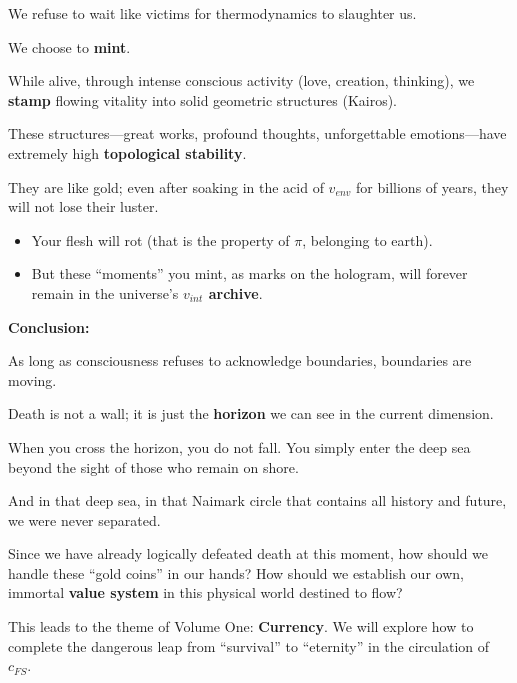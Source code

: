 We refuse to wait like victims for thermodynamics to slaughter us.

We choose to \textbf{mint}.

While alive, through intense conscious activity (love, creation, thinking), we \textbf{stamp} flowing vitality into solid geometric structures (Kairos).

These structures---great works, profound thoughts, unforgettable emotions---have extremely high \textbf{topological stability}.

They are like gold; even after soaking in the acid of $v_{env}$ for billions of years, they will not lose their luster.

\begin{itemize}
\item Your flesh will rot (that is the property of $\pi$, belonging to earth).

\item But these ``moments'' you mint, as marks on the hologram, will forever remain in the universe's \textbf{$v_{int}$ archive}.
\end{itemize}

\textbf{Conclusion:}

As long as consciousness refuses to acknowledge boundaries, boundaries are moving.

Death is not a wall; it is just the \textbf{horizon} we can see in the current dimension.

When you cross the horizon, you do not fall. You simply enter the deep sea beyond the sight of those who remain on shore.

And in that deep sea, in that Naimark circle that contains all history and future, we were never separated.

Since we have already logically defeated death at this moment, how should we handle these ``gold coins'' in our hands? How should we establish our own, immortal \textbf{value system} in this physical world destined to flow?

This leads to the theme of Volume One: \textbf{Currency}. We will explore how to complete the dangerous leap from ``survival'' to ``eternity'' in the circulation of $c_{FS}$.

